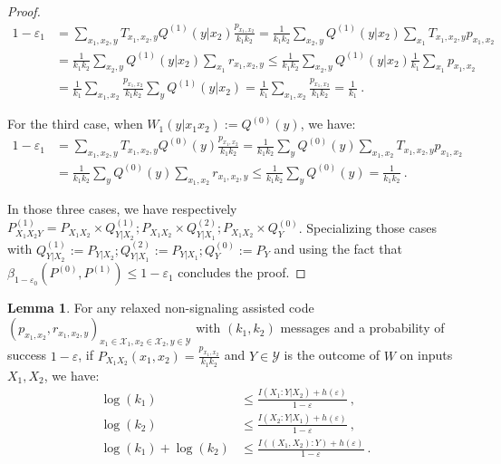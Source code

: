 \documentclass[11pt]{article}
\theoremstyle{definition}
\newtheorem{lem}[theo]{Lemma}
\theoremstyle{remark}
\begin{document}
\begin{proof}
  \begin{equation}
    \begin{aligned}
      1 - \varepsilon_1 &= \sum_{x_1,x_2,y} T_{x_1,x_2,y}Q^{(1)}(y|x_2)\frac{p_{x_1,x_2}}{k_1k_2} = \frac{1}{k_1k_2} \sum_{x_2,y} Q^{(1)}(y|x_2) \sum_{x_1}T_{x_1,x_2,y}p_{x_1,x_2}\\
      &= \frac{1}{k_1k_2}\sum_{x_2,y} Q^{(1)}(y|x_2) \sum_{x_1}r_{x_1,x_2,y} \leq \frac{1}{k_1k_2} \sum_{x_2,y} Q^{(1)}(y|x_2)\frac{1}{k_1}\sum_{x_1}p_{x_1,x_2}\\
      &= \frac{1}{k_1} \sum_{x_1,x_2}\frac{p_{x_1,x_2}}{k_1k_2}\sum_yQ^{(1)}(y|x_2) = \frac{1}{k_1}\sum_{x_1,x_2}\frac{p_{x_1,x_2}}{k_1k_2} = \frac{1}{k_1} \ .
    \end{aligned}
  \end{equation}
  
  For the third case, when $W_1(y|x_1x_2) := Q^{(0)}(y)$, we have:
  \begin{equation}
    \begin{aligned}
      1 - \varepsilon_1 &= \sum_{x_1,x_2,y} T_{x_1,x_2,y}Q^{(0)}(y)\frac{p_{x_1,x_2}}{k_1k_2} = \frac{1}{k_1k_2} \sum_{y} Q^{(0)}(y) \sum_{x_1,x_2}T_{x_1,x_2,y}p_{x_1,x_2}\\
      &= \frac{1}{k_1k_2}\sum_{y} Q^{(0)}(y) \sum_{x_1,x_2}r_{x_1,x_2,y} \leq \frac{1}{k_1k_2}\sum_{y} Q^{(0)}(y) = \frac{1}{k_1k_2} \ .
    \end{aligned}
  \end{equation}
  
  In those three cases, we have respectively $P^{(1)}_{X_1X_2Y} = P_{X_1X_2} \times Q^{(1)}_{Y|X_2}; P_{X_1X_2} \times Q^{(2)}_{Y|X_1}; P_{X_1X_2} \times Q^{(0)}_{Y}$. Specializing those cases with $Q^{(1)}_{Y|X_2}:=P_{Y|X_2}; Q^{(2)}_{Y|X_1}:=P_{Y|X_1}; Q^{(0)}_{Y}:=P_Y$ and using the fact that ${\beta_{1-\varepsilon_0}\left(P^{(0)},P^{(1)}\right) \leq 1 - \varepsilon_1}$ concludes the proof.
  \end{proof}

  \begin{lem}
    \label{lem:oneshotOB}
    For any relaxed non-signaling assisted code $(p_{x_1,x_2}, r_{x_1,x_2,y})_{x_1 \in \mathcal{X}_1,x_2 \in \mathcal{X}_2,y \in \mathcal{Y}}$ with $(k_1,k_2)$ messages and a probability of success $1-\varepsilon$, if $P_{X_1X_2}(x_1,x_2)=\frac{p_{x_1,x_2}}{k_1k_2}$ and $Y \in \mathcal{Y}$ is the outcome of $W$ on inputs $X_1,X_2$, we have:
    \begin{equation}
      \begin{aligned}
        \log(k_1) &\leq \frac{I(X_1:Y|X_2)+h(\varepsilon)}{1-\varepsilon} \ ,\\
        \log(k_2) &\leq \frac{I(X_2:Y|X_1)+h(\varepsilon)}{1-\varepsilon} \ ,\\
        \log(k_1)+\log(k_2) &\leq \frac{I((X_1,X_2):Y)+h(\varepsilon)}{1-\varepsilon} \ .
      \end{aligned}
    \end{equation}
  \end{lem}
  
\end{document}

